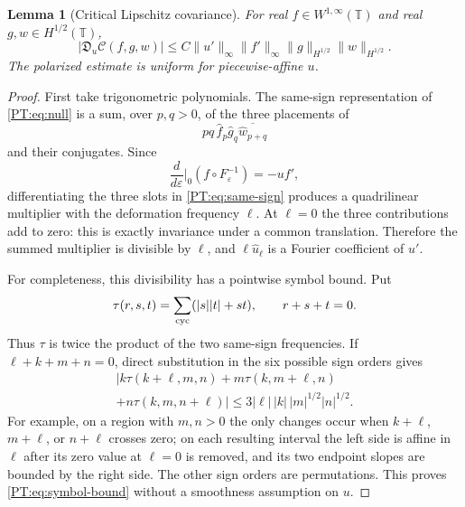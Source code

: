\documentclass[11pt]{amsart}
\numberwithin{equation}{section}
\newtheorem{lemma}[theorem]{Lemma}
\theoremstyle{definition}
\theoremstyle{remark}
\newcommand{\T}{\mathbb T}
\newcommand{\Cnull}{\mathcal C}
\begin{document}
\begin{lemma}[Critical Lipschitz covariance]\label{PT:lem:covariance}
For real $f\in W^{1,\infty}(\T)$ and real
$g,w\in H^{1/2}(\T)$,
\begin{equation}\label{PT:eq:covariance}
 \boxed{
 |\mathfrak D_u\Cnull(f,g,w)|
 \le C\|u'\|_\infty\|f'\|_\infty
       \|g\|_{H^{1/2}}\|w\|_{H^{1/2}}.}
\end{equation}
The polarized estimate is uniform for piecewise-affine $u$.
\end{lemma}

\begin{proof}
First take trigonometric polynomials.  The same-sign representation of
\eqref{PT:eq:null} is a sum, over $p,q>0$, of the three placements of
\begin{equation}\label{PT:eq:same-sign}
 pq\,\widehat f_p\widehat g_q\overline{\widehat w_{p+q}}
\end{equation}
and their conjugates.  Since
\[
 \frac d{d\varepsilon}\bigg|_0
 (f\circ F_\varepsilon^{-1})=-uf',
\]
differentiating the three slots in \eqref{PT:eq:same-sign} produces a
quadrilinear multiplier with the deformation frequency $\ell$.  At
$\ell=0$ the three contributions add to zero: this is exactly invariance
under a common translation.  Therefore the summed multiplier is divisible
by $\ell$, and $\ell\widehat u_\ell$ is a Fourier coefficient of $u'$.

For completeness, this divisibility has a pointwise symbol bound.  Put
\[
 \tau(r,s,t)=\sum_{\rm cyc}(|s||t|+st),
 \qquad r+s+t=0.
\]
Thus $\tau$ is twice the product of the two same-sign frequencies.  If
$\ell+k+m+n=0$, direct substitution in the six possible sign orders gives
\begin{multline}\label{PT:eq:symbol-bound}
 \big|k\tau(k+\ell,m,n)+m\tau(k,m+\ell,n)\\
       +n\tau(k,m,n+\ell)\big|
 \le3|\ell|\,|k|\,|m|^{1/2}|n|^{1/2}.
\end{multline}
For example, on a region with $m,n>0$ the only changes occur when
$k+\ell$, $m+\ell$, or $n+\ell$ crosses zero; on each resulting interval
the left side is affine in $\ell$ after its zero value at $\ell=0$ is
removed, and its two endpoint slopes are bounded by the right side.
The other sign orders are permutations.  This proves
\eqref{PT:eq:symbol-bound} without a smoothness assumption on $u$.


\end{proof}
\end{document}
